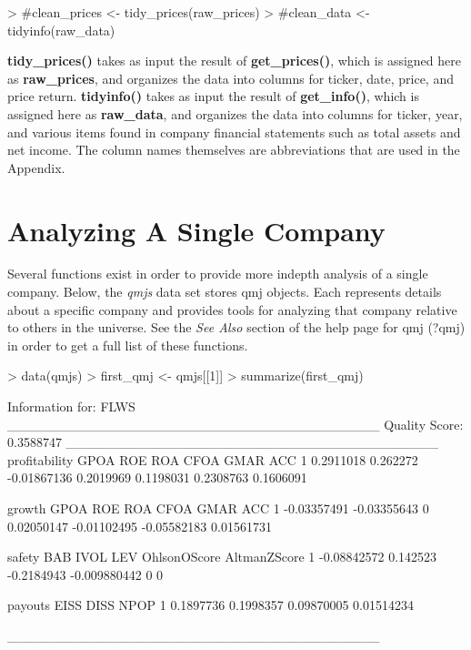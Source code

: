 \documentclass[titlepage]{article}
\begin{document}
\begin{Schunk}
\begin{Sinput}
> #clean_prices <- tidy_prices(raw_prices)
> #clean_data <- tidyinfo(raw_data)
\end{Sinput}
\end{Schunk}

\textbf{tidy\_prices()} takes as input the result of \textbf{get\_prices()}, which is assigned here as \textbf{raw\_prices}, and organizes the data into columns for ticker, date, price, and price return. \textbf{tidyinfo()} takes as input the result of \textbf{get\_info()}, which is assigned here as \textbf{raw\_data}, and organizes the data into columns for ticker, year, and various items found in company financial statements such as total assets and net income. The column names themselves are abbreviations that are used in the Appendix. 

\section*{Analyzing A Single Company}
Several functions exist in order to provide more indepth analysis of a single company. Below, the \textit{qmjs} data set stores qmj objects. Each represents details about a specific company and provides tools for analyzing that company relative to others in the universe. See the \textit{See Also} section of the help page for qmj (?qmj) in order to get a full list of these functions.

\begin{Schunk}
\begin{Sinput}
> data(qmjs)
> first_qmj <- qmjs[[1]]
> summarize(first_qmj) 
\end{Sinput}
\begin{Soutput}
Information for:  FLWS
_______________________________________
Quality Score:  0.3588747
_______________________________________
  profitability     GPOA         ROE       ROA      CFOA      GMAR       ACC
1     0.2911018 0.262272 -0.01867136 0.2019969 0.1198031 0.2308763 0.1606091


       growth        GPOA ROE        ROA        CFOA        GMAR        ACC
1 -0.03357491 -0.03355643   0 0.02050147 -0.01102495 -0.05582183 0.01561731


       safety      BAB       IVOL          LEV OhlsonOScore AltmanZScore
1 -0.08842572 0.142523 -0.2184943 -0.009880442            0            0


    payouts      EISS       DISS       NPOP
1 0.1897736 0.1998357 0.09870005 0.01514234

_______________________________________
\end{Soutput}
\end{Schunk}
\end{document}
